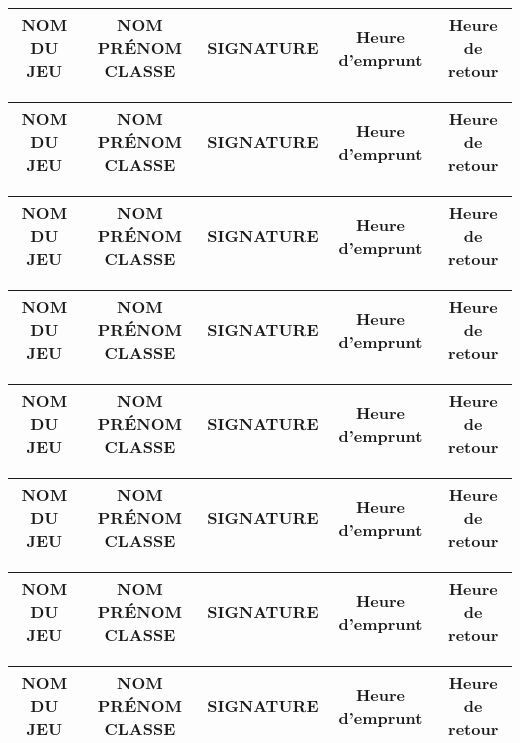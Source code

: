 \documentclass[8pt,a4paper]{article}
\begin{document}
\begin{table}[ht]
   		\begin{tabular}{|c|c|c|c|c|}
  			\hline
			NOM DU JEU &NOM PR\'ENOM CLASSE &SIGNATURE & Heure d'emprunt & Heure de retour \\
		  	\hline
   		\end{tabular}
			
   		\begin{tabular}{|c|c|c|c|c|}
			\hline	
			NOM DU JEU &NOM PR\'ENOM CLASSE &SIGNATURE & Heure d'emprunt & Heure de retour \\
			\hline
   		\end{tabular}

   		\begin{tabular}{|c|c|c|c|c|}
			\hline	
			NOM DU JEU &NOM PR\'ENOM CLASSE &SIGNATURE & Heure d'emprunt & Heure de retour \\
			\hline
   		\end{tabular}

   		\begin{tabular}{|c|c|c|c|c|}
			\hline	
			NOM DU JEU &NOM PR\'ENOM CLASSE &SIGNATURE & Heure d'emprunt & Heure de retour \\
			\hline
   		\end{tabular}

   		\begin{tabular}{|c|c|c|c|c|}
			\hline	
			NOM DU JEU &NOM PR\'ENOM CLASSE &SIGNATURE & Heure d'emprunt & Heure de retour \\
			\hline
   		\end{tabular}

   		\begin{tabular}{|c|c|c|c|c|}
			\hline	
			NOM DU JEU &NOM PR\'ENOM CLASSE &SIGNATURE & Heure d'emprunt & Heure de retour \\
			\hline
   		\end{tabular}

   		\begin{tabular}{|c|c|c|c|c|}
			\hline	
			NOM DU JEU &NOM PR\'ENOM CLASSE &SIGNATURE & Heure d'emprunt & Heure de retour \\
			\hline
   		\end{tabular}

   		\begin{tabular}{|c|c|c|c|c|}
			\hline	
			NOM DU JEU &NOM PR\'ENOM CLASSE &SIGNATURE & Heure d'emprunt & Heure de retour \\
			\hline
   		\end{tabular}


\end{table}
\end{document}
